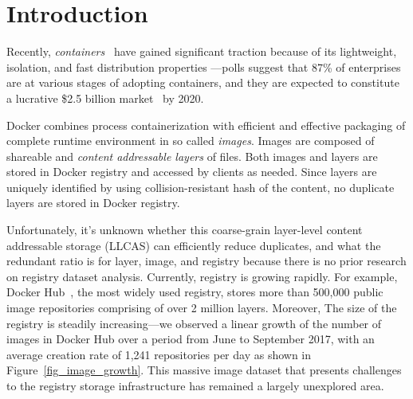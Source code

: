 \section{Introduction}

	
Recently, \emph{containers}~\cite{process-containers-linux} have
gained significant traction because of its lightweight, isolation, and fast distribution properties
---polls suggest that 87\% of enterprises are
at various stages of adopting containers, and they are expected to
constitute a lucrative \$2.5 billion
market~\cite{container-grow-by2020} by 2020.

Docker combines process containerization with efficient and
effective packaging of complete runtime environment
in so called {\em images}.
Images are composed of shareable and
{\em content addressable layers} of files. Both images
and layers are stored in Docker registry and accessed by clients as needed. 
Since 
layers are uniquely identified by using collision-resistant hash of the content, no duplicate layers are stored in Docker registry.
%

Unfortunately, it's unknown whether  
this coarse-grain layer-level content addressable storage (LLCAS) can efficiently reduce duplicates, and what the redundant ratio is for layer, image, and registry because there is no prior research on registry dataset analysis. Currently, registry is growing rapidly. For example, 
Docker Hub~\cite{docker-hub}, the most widely used registry, stores more than 500,000 public image repositories comprising of over 2 million layers. Moreover,
The size of the registry 
is steadily increasing---we observed a linear growth of the
number of images in Docker Hub over a period from June to September 2017, with an average creation rate of 1,241
repositories per day as shown in Figure~\ref{fig_image_growth}.
This massive image dataset 
that presents challenges to the registry
storage infrastructure has remained a largely unexplored
area.

